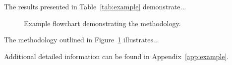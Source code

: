 The results presented in Table~\ref{tab:example} demonstrate...


\begin{figure}[H]
    \centering
    \resizebox{!}{0.3\textheight}{
        
    }
    \caption{Example flowchart demonstrating the methodology.}
    \label{fig:example_flowchart}
\end{figure}

The methodology outlined in Figure~\ref{fig:example_flowchart} illustrates...


Additional detailed information can be found in Appendix~\ref{app:example}.